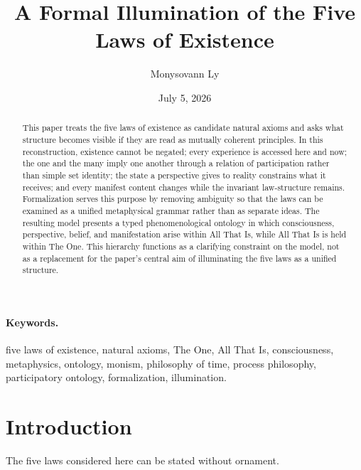 \documentclass[11pt]{article}
\title{A Formal Illumination of the Five Laws of Existence}
\author{Monysovann Ly}
\date{July 5, 2026}
\begin{document}
{\setlength{\parskip}{0pt}
\maketitle

\begin{abstract}
This paper treats the five laws of existence as candidate natural axioms and asks what structure becomes visible if they are read as mutually coherent principles.  In this reconstruction, existence cannot be negated; every experience is accessed here and now; the one and the many imply one another through a relation of participation rather than simple set identity; the state a perspective gives to reality constrains what it receives; and every manifest content changes while the invariant law-structure remains.  Formalization serves this purpose by removing ambiguity so that the laws can be examined as a unified metaphysical grammar rather than as separate ideas.  The resulting model presents a typed phenomenological ontology in which consciousness, perspective, belief, and manifestation arise within All That Is, while All That Is is held within The One.  This hierarchy functions as a clarifying constraint on the model, not as a replacement for the paper's central aim of illuminating the five laws as a unified structure.
\end{abstract}

\paragraph{Keywords.}
five laws of existence, natural axioms, The One, All That Is, consciousness, metaphysics, ontology, monism, philosophy of time, process philosophy, participatory ontology, formalization, illumination.
\newpage

\tableofcontents
\bigskip
\newpage
}

\section{Introduction}

The five laws considered here can be stated without ornament.

\begin{center}
\end{center}
\end{document}
